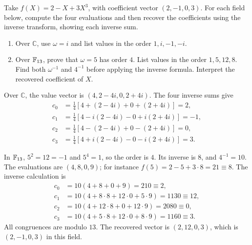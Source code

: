 \studentbreak
{}
Take $f(X)=2-X+3X^3$, with coefficient vector $(2,-1,0,3)$.
For each field below, compute the four evaluations and then recover
the coefficients using the inverse transform, showing each inverse sum.
\begin{enumerate}
 \item Over $\mathbb C$, use $\omega=i$ and list values in the order
 $1,i,-1,-i$. 
 \item Over $\mathbb F_{13}$, prove that $\omega=5$ has order $4$.
 List values in the order $1,5,12,8$. Find both $\omega^{-1}$ and
 $4^{-1}$ before applying the inverse formula. Interpret the recovered
 coefficient of $X$. 
\end{enumerate}
\begin{solution}
Over $\mathbb C$, the value vector is $(4,2-4i,0,2+4i)$.
The four inverse sums give
\[
\begin{aligned}
 c_0&=\tfrac14[4+(2-4i)+0+(2+4i)]=2,\\
 c_1&=\tfrac14[4-i(2-4i)-0+i(2+4i)]=-1,\\
 c_2&=\tfrac14[4-(2-4i)+0-(2+4i)]=0,\\
 c_3&=\tfrac14[4+i(2-4i)-0-i(2+4i)]=3.
\end{aligned}
\]
\par\noindent\begin{minipage}{\linewidth}
In $\mathbb F_{13}$, $5^2=12=-1$ and $5^4=1$, so the order is $4$.
Its inverse is $8$, and $4^{-1}=10$.
The evaluations are $(4,8,0,9)$; for instance
$f(5)=2-5+3\cdot8=21\equiv8$. The inverse calculation is
\[
\begin{aligned}
 c_0&=10(4+8+0+9)=210\equiv2,\\
 c_1&=10(4+8\cdot8+12\cdot0+5\cdot9)=1130\equiv12,\\
 c_2&=10(4+12\cdot8+0+12\cdot9)=2080\equiv0,\\
 c_3&=10(4+5\cdot8+12\cdot0+8\cdot9)=1160\equiv3.
\end{aligned}
\]
All congruences are modulo $13$. The recovered vector is $(2,12,0,3)$,
which is $(2,-1,0,3)$ in this field.
\end{minipage}
\end{solution}

